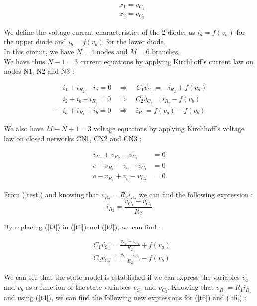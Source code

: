 \begin{equation}
\begin{split}
&x_1 = v_{C_1}\\
&x_2=v_{C_2}
\end{split} 
\end{equation}

We define the voltage-current characteristics of the 2 diodes as $i_a=f(v_a)$ for the upper diode and $i_b=f(v_b)$ for the lower diode.\\

In this circuit, we have $N=4$ nodes and $M=6$ branches.\\

We have thus $N-1=3$ current equations by applying Kirchhoff's current law on nodes N1, N2 and N3 :

\begin{align}
\label{t1}
&i_1+i_{R_2}-i_a = 0 \quad \Rightarrow \quad C_1\dot{v_{C_1}} = -i_{R_2}+f(v_a)\\
\label{t2}
&i_2+i_b-i_{R_2} = 0 \quad \Rightarrow\quad C_2\dot{v_{C_2}} = i_{R_2}-f(v_b)\\
\label{t4}
-&i_a+i_{R_1}+i_b = 0 \quad \Rightarrow \quad i_{R_1} = f(v_a)-f(v_b)
\end{align}


We also have $M-N+1=3$ voltage equations by applying Kirchhoff's voltage law on closed networks CN1, CN2 and CN3 :

\begin{align}
\label{test}
v_{C_2}+v_{R_2}-v_{C_1} & = 0\\
\label{t6}
e - v_{R_1} - v_a - v_{C_1} & = 0\\
\label{t5}
e - v_{R_1} + v_b - v_{C_2} & = 0
\end{align}

From (\ref{test}) and knowing that $v_{R_2}=R_2 i_{R_2}$ we can find the following expression : 
\begin{equation}
\label{t3}
i_{R_2}=\frac{v_{C_1}-v_{C_2}}{R_2}
\end{equation}

By replacing (\ref{t3}) in (\ref{t1}) and (\ref{t2}), we can find :

\begin{align}
&C_1\dot{v_{C_1}} = \frac{v_{C_2}-v_{C_1}}{R_2}+f(v_a)\\
&C_2\dot{v_{C_2}} = \frac{v_{C_1}-v_{C_2}}{R_2}-f(v_b)
\end{align}

We can see that the state model is established if we can express the variables $v_a$ and $v_b$ as a function of the state variables $v_{C_1}$ and $v_{C_2}$. Knowing that $v_{R_1}=R_1i_{R_1}$ and using (\ref{t4}), we can find the following new expressions for (\ref{t6}) and (\ref{t5}) :

